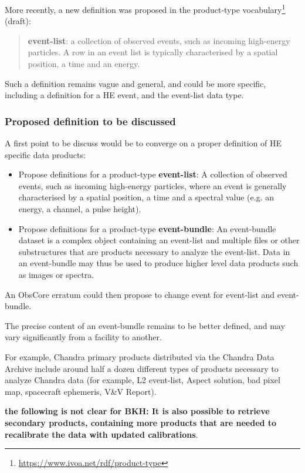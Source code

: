 \documentclass[11pt,a4paper]{ivoa}
\begin{document}
More recently, a new definition was proposed in the product-type vocabulary\footnote{\url{https://www.ivoa.net/rdf/product-type}} (draft):
\begin{quote}
    \textbf{event-list}: a collection of observed events, such as incoming high-energy particles. A row in an event
    list is typically characterised by a spatial position, a time and an energy.
\end{quote}

Such a definition remains vague and general, and could be more specific, including a definition for a HE event, and the
event-list data type.

\subsubsection{Proposed definition to be discussed}

A first point to be discuss would be to converge on a proper definition of HE specific data products:
\begin{itemize}
    \item Propose definitions for a product-type \textbf{event-list}: A collection of observed events, such as incoming
    high-energy particles, where an event is generally characterised by a spatial position, a time and a spectral value
    (e.g. an energy, a channel, a pulse height).
    \item Propose definitions for a product-type \textbf{event-bundle}: An event-bundle dataset is a complex object
    containing an event-list and multiple files or other substructures that are products necessary to analyze the
    event-list. Data in an event-bundle may thus be used to produce higher level data products such as images or spectra.
\end{itemize}

An ObsCore erratum could then propose to change event for event-list and event-bundle.

The precise content of an event-bundle remains to be better defined, and may vary significantly from a facility to another.

For example, Chandra primary products distributed via the Chandra Data Archive include around half a dozen different
types of products necessary to analyze Chandra data (for example, L2 event-list, Aspect solution,
bad pixel map, spacecraft ephemeris, V\&V Report).

{\bf the following is not clear for BKH: It is also possible to retrieve secondary products,
containing more products that are needed to recalibrate the data with updated calibrations}.
\end{document}
